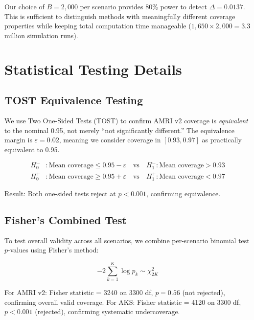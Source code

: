 \documentclass[12pt]{article}
\theoremstyle{definition}
\theoremstyle{remark}
\begin{document}
Our choice of $B = 2{,}000$ per scenario provides 80\% power to detect
$\Delta = 0.0137$. This is sufficient to distinguish methods with
meaningfully different coverage properties while keeping total computation
time manageable ($1{,}650 \times 2{,}000 = 3.3$ million simulation runs).


\section{Statistical Testing Details}
\label{sec:supp_testing}

\subsection{TOST Equivalence Testing}

We use Two One-Sided Tests (TOST) to confirm AMRI v2 coverage is
\textit{equivalent} to the nominal 0.95, not merely ``not significantly
different.'' The equivalence margin is $\varepsilon = 0.02$, meaning we
consider coverage in $[0.93, 0.97]$ as practically equivalent to 0.95.

\begin{align}
H_0^-&: \text{Mean coverage} \leq 0.95 - \varepsilon \quad\text{vs}\quad H_1^-: \text{Mean coverage} > 0.93 \\
H_0^+&: \text{Mean coverage} \geq 0.95 + \varepsilon \quad\text{vs}\quad H_1^+: \text{Mean coverage} < 0.97
\end{align}

Result: Both one-sided tests reject at $p < 0.001$, confirming equivalence.

\subsection{Fisher's Combined Test}

To test overall validity across all scenarios, we combine per-scenario
binomial test $p$-values using Fisher's method:

\begin{equation}
-2 \sum_{k=1}^K \log p_k \sim \chi^2_{2K}
\end{equation}

For AMRI v2: Fisher statistic = 3240 on 3300 df, $p = 0.56$ (not rejected),
confirming overall valid coverage. For AKS: Fisher statistic = 4120 on 3300 df,
$p < 0.001$ (rejected), confirming systematic undercoverage.
\end{document}
